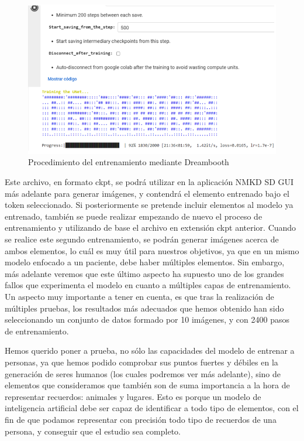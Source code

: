 \begin{figure}[h]
	\centering
	\includegraphics[width = 1
	\textwidth]{Imagenes/Vectorial/dreambooth.png}
	\caption{Procedimiento del entrenamiento mediante Dreambooth}
	\label{fig:dreambooth}
\end{figure}

Este archivo, en formato ckpt, se podrá utilizar en la aplicación NMKD SD GUI más adelante para generar imágenes, y contendrá el elemento entrenado bajo el token seleccionado. Si posteriormente se pretende incluir elementos al modelo ya entrenado, también se puede realizar empezando de nuevo el proceso de entrenamiento y utilizando de base el archivo en extensión ckpt anterior. Cuando se realice este segundo entrenamiento, se podrán generar imágenes acerca de ambos elementos, lo cuál es muy útil para nuestros objetivos, ya que en un mismo modelo enfocado a un paciente, debe haber múltiples elementos. Sin embargo, más adelante veremos que este último aspecto ha supuesto uno de los grandes fallos que experimenta el modelo en cuanto a múltiples capas de entrenamiento. \\

Un aspecto muy importante a tener en cuenta, es que tras la realización de múltiples pruebas, los resultados más adecuados que hemos obtenido han sido seleccionando un conjunto de datos formado por 10 imágenes, y con 2400 pasos de entrenamiento. 


Hemos querido poner a prueba, no sólo las capacidades del modelo de entrenar a personas, ya que hemos podido comprobar sus puntos fuertes y débiles en la generación de seres humanos (los cuales podremos ver más adelante), sino de elementos que consideramos que también son de suma importancia a la hora de representar recuerdos: animales y lugares. Esto es porque un modelo de inteligencia artificial debe ser capaz de identificar a todo tipo de elementos, con el fin de que podamos representar con precisión todo tipo de recuerdos de una persona, y conseguir que el estudio sea completo. \\

